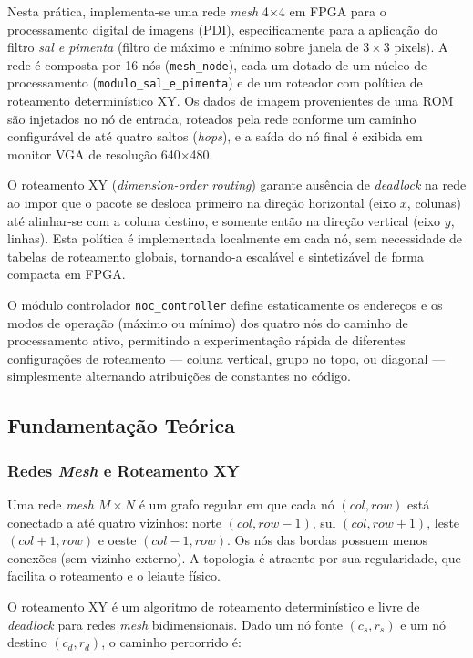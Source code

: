 \documentclass[12pt, a4paper]{article}
\begin{document}
	Nesta prática, implementa-se uma rede \textit{mesh} 4$\times$4 em FPGA para
	o processamento digital de imagens (PDI), especificamente para a aplicação do
	filtro \textit{sal e pimenta} (filtro de máximo e mínimo sobre janela de
	$3\times3$ pixels). A rede é composta por 16 nós (\texttt{mesh\_node}), cada
	um dotado de um núcleo de processamento (\texttt{modulo\_sal\_e\_pimenta}) e
	de um roteador com política de roteamento determinístico XY. Os dados de
	imagem provenientes de uma ROM são injetados no nó de entrada, roteados pela
	rede conforme um caminho configurável de até quatro saltos (\textit{hops}), e
	a saída do nó final é exibida em monitor VGA de resolução 640$\times$480.
	
	O roteamento XY (\textit{dimension-order routing}) garante ausência de
	\textit{deadlock} na rede ao impor que o pacote se desloca primeiro na direção
	horizontal (eixo $x$, colunas) até alinhar-se com a coluna destino, e somente
	então na direção vertical (eixo $y$, linhas). Esta política é implementada
	localmente em cada nó, sem necessidade de tabelas de roteamento globais,
	tornando-a escalável e sintetizável de forma compacta em FPGA.
	
	O módulo controlador \texttt{noc\_controller} define estaticamente os
	endereços e os modos de operação (máximo ou mínimo) dos quatro nós do caminho
	de processamento ativo, permitindo a experimentação rápida de diferentes
	configurações de roteamento --- coluna vertical, grupo no topo, ou diagonal
	--- simplesmente alternando atribuições de constantes no código.
	
	\subsection{Fundamentação Teórica}
	
	\subsubsection{Redes \textit{Mesh} e Roteamento XY}
	
	Uma rede \textit{mesh} $M \times N$ é um grafo regular em que cada nó
	$(col, row)$ está conectado a até quatro vizinhos: norte $(col, row-1)$,
	sul $(col, row+1)$, leste $(col+1, row)$ e oeste $(col-1, row)$. Os nós das
	bordas possuem menos conexões (sem vizinho externo). A topologia é atraente
	por sua regularidade, que facilita o roteamento e o leiaute físico.
	
	O roteamento XY é um algoritmo de roteamento determinístico e livre de
	\textit{deadlock} para redes \textit{mesh} bidimensionais. Dado um nó fonte
	$(c_s, r_s)$ e um nó destino $(c_d, r_d)$, o caminho percorrido é:
	
\end{document}
